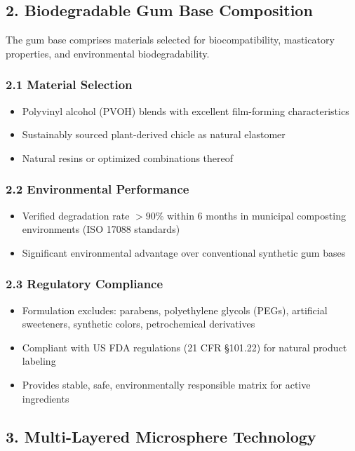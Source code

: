 \documentclass[12pt]{article}
\begin{document}
\subsection*{2. Biodegradable Gum Base Composition}
The gum base comprises materials selected for biocompatibility, masticatory properties, and environmental biodegradability.

\subsubsection*{2.1 Material Selection}
\begin{itemize}
    \item Polyvinyl alcohol (PVOH) blends with excellent film-forming characteristics
    \item Sustainably sourced plant-derived chicle as natural elastomer
    \item Natural resins or optimized combinations thereof
\end{itemize}

\subsubsection*{2.2 Environmental Performance}
\begin{itemize}
    \item Verified degradation rate $>90\%$ within 6 months in municipal composting environments (ISO 17088 standards)
    \item Significant environmental advantage over conventional synthetic gum bases
\end{itemize}

\subsubsection*{2.3 Regulatory Compliance}
\begin{itemize}
    \item Formulation excludes: parabens, polyethylene glycols (PEGs), artificial sweeteners, synthetic colors, petrochemical derivatives
    \item Compliant with US FDA regulations (21 CFR §101.22) for natural product labeling
    \item Provides stable, safe, environmentally responsible matrix for active ingredients
\end{itemize}

\subsection*{3. Multi-Layered Microsphere Technology}
\end{document}
